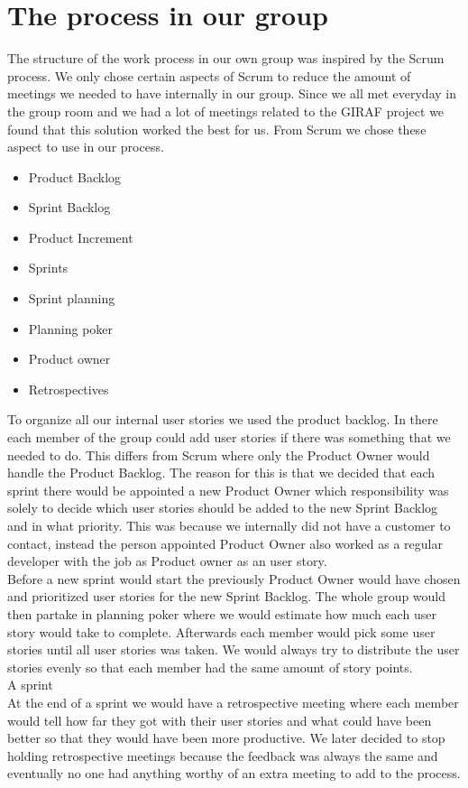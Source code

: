 \section{The process in our group}

The structure of the work process in our own group was inspired by the Scrum process.
We only chose certain aspects of Scrum to reduce the amount of meetings we needed to have internally in our group. 
Since we all met everyday in the group room and we had a lot of meetings related to the GIRAF project we found that this solution worked the best for us.
From Scrum we chose these aspect to use in our process.

 \begin{itemize}
    \item Product Backlog
    \item Sprint Backlog
    \item Product Increment
    \item Sprints
    \item Sprint planning
    \item Planning poker
    \item Product owner
    \item Retrospectives
 \end{itemize}

 To organize all our internal user stories we used the product backlog.
 In there each member of the group could add user stories if there was something that we needed to do.
 This differs from Scrum where only the Product Owner would handle the Product Backlog.
 The reason for this is that we decided that each sprint there would be appointed a new Product Owner which responsibility was solely to decide which user stories should be added to the new Sprint Backlog and in what priority.
 This was because we internally did not have a customer to contact, instead the person appointed Product Owner also worked as a regular developer with the job as Product owner as an user story.
 \\
 Before a new sprint would start the previously Product Owner would have chosen and prioritized user stories for the new Sprint Backlog.
 The whole group would then partake in planning poker where we would estimate how much each user story would take to complete.
 Afterwards each member would pick some user stories until all user stories was taken.
 We would always try to distribute the user stories evenly so that each member had the same amount of story points.
 \\
 A sprint 
 \\
 At the end of a sprint we would have a retrospective meeting where each member would tell how far they got with their user stories and what could have been better so that they would have been more productive.
 We later decided to stop holding retrospective meetings because the feedback was always the same and eventually no one had anything worthy of an extra meeting to add to the process.


